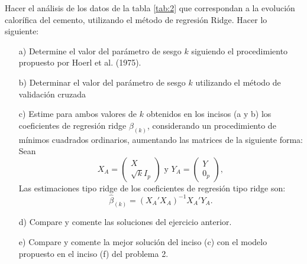 \documentclass[10.5pt,notitlepage]{article}
\theoremstyle{plain}
\begin{document}
\begin{exo}
Hacer
el análisis de los datos de la tabla \ref{tab:2} que correspondan  a la evolución calorífica
del cemento, utilizando el método de regresión Ridge. Hacer lo siguiente:
\begin{itemize}
    \item[a)] Determine el valor del parámetro de sesgo \(\mathit{k}\) siguiendo el procedimiento propuesto por Hoerl et al. (1975).
    \item[b)] Determinar el valor del parámetro de sesgo \(\mathit{k}\) utilizando el método de validación cruzada
    \item[c)] Estime para ambos valores de \(\mathit{k}\) obtenidos en los incisos (a y b) los coeficientes de regresión ridge \(\beta_{(k)}\), considerando un procedimiento de mínimos
cuadrados ordinarios, aumentando las matrices de la siguiente forma: Sean
    \[
    X_A= \begin{pmatrix}X\\ \sqrt{\mathit{k}}I_{p}\end{pmatrix} \text{ y } Y_A = \begin{pmatrix}Y\\ 0_p\end{pmatrix},
    \]
    Las estimaciones tipo ridge de los coeficientes de regresión tipo ridge son:
    \[
    \hat{\beta}_{(k)} = (X_{A}'X_{A})^{-1}X_{A}'Y_{A}.
    \]
    \item[d)] Compare y comente las soluciones del ejercicio anterior. 
    \item[e)] Compare y comente la mejor solución del inciso (c) con el modelo propuesto en el inciso (f) del problema 2.
\end{itemize}
\end{exo}
\end{document}
